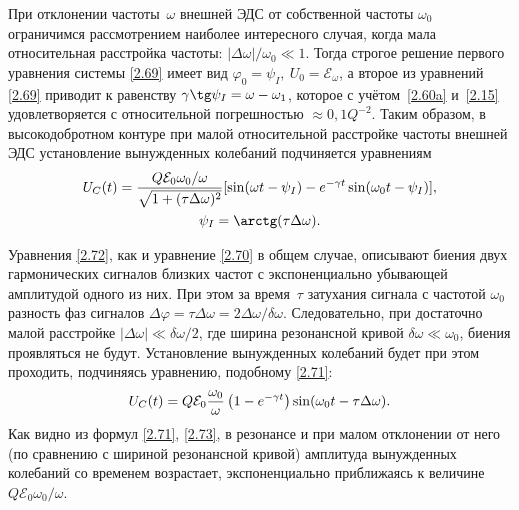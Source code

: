 При отклонении частоты~$\omega$ внешней ЭДС от собственной частоты $\omega_0$
ограничимся рассмотрением наиболее интересного случая, когда
мала относительная расстройка частоты: $|\Delta\omega|/\omega_0\ll 1$. 
Тогда строгое решение первого
уравнения системы \eqref{2.69} имеет вид
$\varphi_0=\psi_I,~U_0 =\mathcal{E}_{\omega}$, а второе из уравнений
\eqref{2.69} приводит к равенству $\gamma\tg\psi_I=\omega-\omega_1$, которое с
учётом~\eqref{2.60a} и~\eqref{2.15} удовлетворяется с относительной погрешностью
$\approx0,1Q^{-2}$. Таким образом, в высокодобротном контуре при малой
относительной расстройке частоты внешней ЭДС установление вынужденных колебаний
подчиняется уравнениям
\begin{equation}
	\eqmark{2.72}
	\begin{gathered}[c]
U_C(t)=\dfrac{Q\mathcal{E}_0\omega_0/\omega}{\sqrt{1+(\tau\Delta\omega)^2}}[
\sin(\omega t-\psi_I)-e^{-\gamma t}\sin(\omega_0t-\psi_I)],\\
		\psi_I=\arctg(\tau\Delta\omega).
	\end{gathered}
\end{equation}

Уравнения \eqref{2.72}, как и уравнение \eqref{2.70} в общем случае, описывают
биения двух гармонических сигналов близких частот с экспоненциально убывающей
амплитудой одного из них. При этом за время~$\tau$ затухания сигнала с частотой
$\omega_0$ разность фаз сигналов
$\Delta\varphi=\tau\Delta\omega=2\Delta\omega/\delta\omega$. Следовательно, при
достаточно малой расстройке
$|\Delta\omega|\ll\delta\omega/2$,
где ширина резонансной кривой 
$\delta\omega \ll \omega_0$, 
биения проявляться не будут. 
Установление вынужденных колебаний будет при этом проходить,
подчиняясь уравнению, подобному \eqref{2.71}:
\begin{equation}\eqmark{2.73}
	U_C(t)=Q\mathcal{E}_0\frac{\omega_0}{\omega}\left(1-e^{-\gamma
t}\right)\sin(\omega_0t-\tau\Delta\omega).
\end{equation}
Как видно из формул \eqref{2.71}, \eqref{2.73}, в резонансе и при малом
отклонении от него (по сравнению с шириной резонансной кривой) амплитуда
вынужденных колебаний со временем возрастает, экспоненциально приближаясь 
к величине $Q\mathcal{E}_0\omega_0/\omega$.

